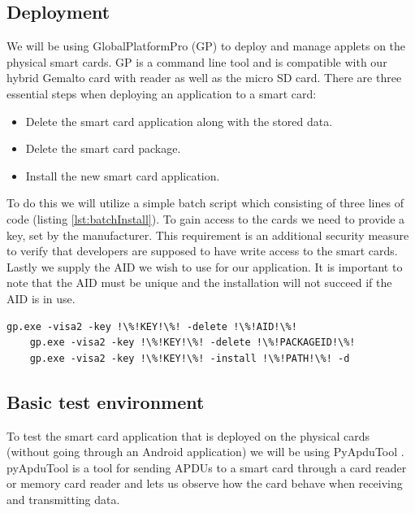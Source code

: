 \subsection{Deployment}
We will be using GlobalPlatformPro (GP) \cite{globalplatform} to deploy and manage applets on the physical smart cards. GP is a command line tool and is compatible with our hybrid Gemalto card with reader as well as the micro SD card. There are three essential steps when deploying an application to a smart card:

\begin{itemize}
    \item Delete the smart card application along with the stored data.
    \item Delete the smart card package.
    \item Install the new smart card application.
\end{itemize}

To do this we will utilize a simple batch script which consisting of three lines of code (listing \ref{lst:batchInstall}). To gain access to the cards we need to provide a key, set by the manufacturer. This requirement is an additional security measure to verify that developers are supposed to have write access to the smart cards. Lastly we supply the AID we wish to use for our application. It is important to note that the AID must be unique and the installation will not succeed if the AID is in use.

\begin{lstlisting}[language=batch,caption=Install and deploy script for GlobalPlatformPro., label=lst:batchInstall,escapechar=!]
    gp.exe -visa2 -key !\%!KEY!\%! -delete !\%!AID!\%!
    gp.exe -visa2 -key !\%!KEY!\%! -delete !\%!PACKAGEID!\%!
    gp.exe -visa2 -key !\%!KEY!\%! -install !\%!PATH!\%! -d
\end{lstlisting}

\subsection{Basic test environment}
To test the smart card application that is deployed on the physical cards (without going through an Android application) we will be using PyApduTool \cite{pyapdutool}. pyApduTool is a tool for sending APDUs to a smart card through a card reader or memory card reader and lets us observe how the card behave when receiving and transmitting data.

